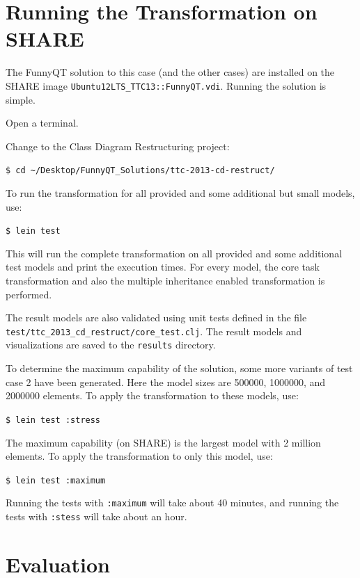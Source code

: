 \documentclass[11pt]{article}
\begin{document}
\section{Running the Transformation on SHARE}
\label{sec:run-transformation}

The FunnyQT solution to this case (and the other cases) are
installed on the SHARE image \verb|Ubuntu12LTS_TTC13::FunnyQT.vdi|.  Running
the solution is simple.

\begin{compactenum}
\item Open a terminal.
\item Change to the Class Diagram Restructuring project:

  \verb|$ cd ~/Desktop/FunnyQT_Solutions/ttc-2013-cd-restruct/|
\item To run the transformation for all provided and some additional but small
  models, use:

  \verb|$ lein test|

  This will run the complete transformation on all provided and some additional
  test models and print the execution times.  For every model, the core task
  transformation and also the multiple inheritance enabled transformation is
  performed.

  \begin{sloppypar}
    The result models are also validated using unit tests defined in the file
    \verb|test/ttc_2013_cd_restruct/core_test.clj|.  The result models and
    visualizations are saved to the \verb|results| directory.
  \end{sloppypar}
\item To determine the maximum capability of the solution, some more variants
  of test case 2 have been generated.  Here the model sizes are 500000,
  1000000, and 2000000 elements.  To apply the transformation to these models,
  use:

  \verb|$ lein test :stress|

  The maximum capability (on SHARE) is the largest model with 2 million
  elements.  To apply the transformation to only this model, use:

  \verb|$ lein test :maximum|

  Running the tests with \verb|:maximum| will take about 40 minutes, and
  running the tests with \verb|:stess| will take about an hour.
\end{compactenum}


\section{Evaluation}
\label{sec:evaluation}
\end{document}
